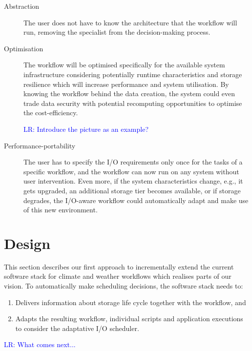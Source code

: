 \documentclass{superfri}
\newcommand{\lr}[1]{\textcolor{blue}{LR: #1}}
\begin{document}
\begin{description}

\item[Abstraction] The user does not have to know the architecture that the workflow will run, removing the specialist from the decision-making process.

\item[Optimisation] The workflow will be optimised specifically for the available system infrastructure considering potentially runtime characteristics and storage resilience which will increase performance and system utilisation.
By knowing the workflow behind the data creation, the system could even trade data security with potential recomputing opportunities to optimise the cost-efficiency.

\lr{Introduce the picture as an example?}

\item[Performance-portability] The user has to specify the I/O requirements only once for the tasks of a specific workflow, and the workflow can now run on any system without user intervention.
Even more, if the system characteristics change, e.g., it gets upgraded, an additional storage tier becomes available, or if storage degrades, the I/O-aware workflow could automatically adapt and make use of this new environment.

\end{description}

\section{Design}

This section describes our first approach to incrementally extend the current software stack for climate and weather workflows which realises parts of our vision.
To automatically make scheduling decisions, the software stack needs to:

\begin{enumerate}

\item Delivers information about storage life cycle together with the workflow, and

\item Adapts the resulting workflow, individual scripts and application executions to consider the adaptative I/O scheduler.

\end{enumerate}

\lr{What comes next...}
\end{document}
